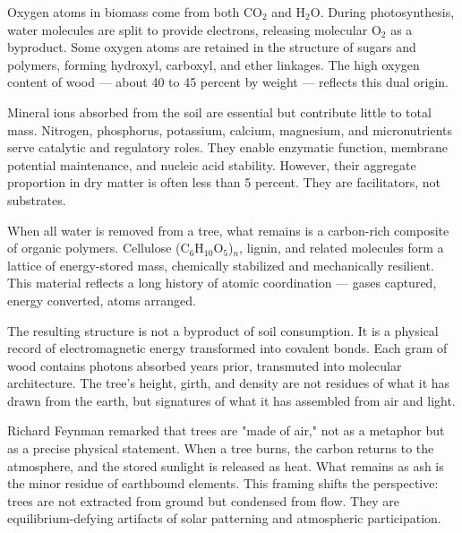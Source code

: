 Oxygen atoms in biomass come from both \(\mathrm{CO}_2\) and \(\mathrm{H}_2\mathrm{O}\). During photosynthesis, water molecules are split to provide electrons, releasing molecular \(\mathrm{O}_2\) as a byproduct. Some oxygen atoms are retained in the structure of sugars and polymers, forming hydroxyl, carboxyl, and ether linkages. The high oxygen content of wood — about 40 to 45 percent by weight — reflects this dual origin.

Mineral ions absorbed from the soil are essential but contribute little to total mass. Nitrogen, phosphorus, potassium, calcium, magnesium, and micronutrients serve catalytic and regulatory roles. They enable enzymatic function, membrane potential maintenance, and nucleic acid stability. However, their aggregate proportion in dry matter is often less than 5 percent. They are facilitators, not substrates.

When all water is removed from a tree, what remains is a carbon-rich composite of organic polymers. Cellulose (C\(_6\)H\(_{10}\)O\(_5\))\(_n\), lignin, and related molecules form a lattice of energy-stored mass, chemically stabilized and mechanically resilient. This material reflects a long history of atomic coordination — gases captured, energy converted, atoms arranged.

The resulting structure is not a byproduct of soil consumption. It is a physical record of electromagnetic energy transformed into covalent bonds. Each gram of wood contains photons absorbed years prior, transmuted into molecular architecture. The tree's height, girth, and density are not residues of what it has drawn from the earth, but signatures of what it has assembled from air and light.

Richard Feynman remarked that trees are "made of air," not as a metaphor but as a precise physical statement. When a tree burns, the carbon returns to the atmosphere, and the stored sunlight is released as heat. What remains as ash is the minor residue of earthbound elements. This framing shifts the perspective: trees are not extracted from ground but condensed from flow. They are equilibrium-defying artifacts of solar patterning and atmospheric participation.

